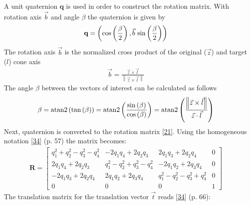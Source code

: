 \documentclass[letterpaper,10pt,english]{sphinxmanual}
\begin{document}
\sphinxAtStartPar
A unit quaternion \(\textbf{q}\) is used in order to construct the rotation matrix. With rotation axis \(\vec{b}\) and angle \(\beta\) the quaternion is given by
\begin{equation*}
\begin{split}\textbf{q} = \left ( \textup{cos}\left (\frac{\beta}{2}\right ), \vec{b}\textup{ sin}\left ( \frac{\beta}{2} \right )\right )\end{split}
\end{equation*}
\sphinxAtStartPar
The rotation axis \(\vec{b}\) is the normalized cross product of the original (\(\vec{z}\)) and target (\(l\)) cone axis
\begin{equation*}
\begin{split}\vec{b}=\frac{\vec{z}\times\vec{l}}{\left \| \vec{z}\times\vec{l} \right \|}\end{split}
\end{equation*}
\sphinxAtStartPar
The angle \(\beta\) between the vectors of interest can be calculated as follows
\begin{equation*}
\begin{split}\beta
=\textup{atan2}\left ( \textup{tan}\left ( \beta \right ) \right )
=\textup{atan2}\left ( \frac{\textup{sin}\left ( \beta \right )}{\textup{cos}\left ( \beta \right )} \right )
=\textup{atan2}\left ( \frac{\left \| \vec{z}\times\vec{l} \right \|}{\vec{z}\cdot \vec{l}} \right )\end{split}
\end{equation*}
\sphinxAtStartPar
Next, quaternion is converted to the rotation matrix {[}\hyperlink{cite.NBodySimulation/Appendix:id7}{21}{]}. Using the homogeneous notation {[}\hyperlink{cite.NBodySimulation/Appendix:id8}{34}{]} (p. 57) the matrix becomes:
\begin{equation*}
\begin{split}\mathbf{R}=\begin{bmatrix}
q_{1}^{2}+q_{2}^{2}-q_{3}^{2}-q_{4}^{2} & -2q_{1}q_{4}+2q_{2}q_{3} & 2q_{1}q_{3}+2q_{2}q_{4} & 0\\
2q_{1}q_{4}+2q_{2}q_{3} & q_{1}^{2}-q_{2}^{2}+q_{3}^{2}-q_{4}^{2} & -2q_{1}q_{2}+2q_{3}q_{4} & 0\\
-2q_{1}q_{3}+2q_{2}q_{4} & 2q_{1}q_{2}+2q_{3}q_{4} & q_{1}^{2}-q_{2}^{2}-q_{3}^{2}+q_{4}^{2} & 0\\
0  & 0 & 0 & 1
\end{bmatrix}\end{split}
\end{equation*}
\sphinxAtStartPar
The translation matrix for the translation vector \(\vec{t}\) reads {[}\hyperlink{cite.NBodySimulation/Appendix:id8}{34}{]} (p. 66):
\end{document}
